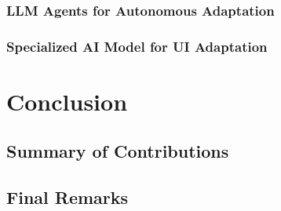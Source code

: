 \documentclass[openany]{book}
\begin{document}
    \subsection{LLM Agents for Autonomous Adaptation}
    \subsection{Specialized AI Model for UI Adaptation}

\chapter{Conclusion}
\section{Summary of Contributions}
\section{Final Remarks}

\printbibliography[title=References]
\end{document}

